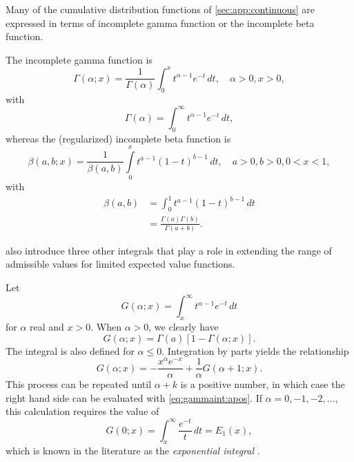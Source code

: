 \documentclass[x11names]{article}
\begin{document}
Many of the cumulative distribution functions of
\autoref{sec:app:continuous} are expressed in terms of incomplete
gamma function or the incomplete beta function.

The incomplete gamma function is
\begin{displaymath}
  \Gamma(\alpha; x) = \frac{1}{\Gamma(\alpha)}
  \int_0^x t^{\alpha - 1} e^{-t}\, dt, \quad \alpha > 0, x > 0,
\end{displaymath}
with
\begin{displaymath}
  \Gamma(\alpha) = \int_0^\infty t^{\alpha - 1} e^{-t}\, dt,
\end{displaymath}
whereas the (regularized) incomplete beta function is
\begin{displaymath}
  \beta(a, b; x) = \frac{1}{\beta(a, b)}
  \int\limits_0^x t^{a - 1} (1 - t)^{b - 1}\, dt, \quad a > 0, b > 0, 0 < x < 1,
\end{displaymath}
with
\begin{align*}
  \beta(a, b)
  &= \int_0^1 t^{a - 1} (1 - t)^{b - 1}\, dt \\
  &= \frac{\Gamma(a) \Gamma(b)}{\Gamma(a + b)}.
\end{align*}

\citet{LossModels4e} also introduce three other integrals that play a
role in extending the range of admissible values for limited expected
value functions.

Let
\begin{equation}
  \label{eq:gammaint}
  G(\alpha; x) = \int_x^\infty t^{\alpha - 1} e^{-t}\, dt
\end{equation}
for $\alpha$ real and $x > 0$. When $\alpha > 0$, we clearly have
\begin{equation*}
  \label{eq:gammaint:apos}
  G(\alpha; x) = \Gamma(a) [1 - \Gamma(\alpha; x)].
\end{equation*}
The integral is also defined for $\alpha \le 0$. Integration by parts
yields the relationship
\begin{equation*}
  G(\alpha; x) = -\frac{x^\alpha e^{-x}}{\alpha}
  + \frac{1}{\alpha} G(\alpha + 1; x).
\end{equation*}
This process can be repeated until $\alpha + k$ is a positive number,
in which case the right hand side can be evaluated with
\eqref{eq:gammaint:apos}. If $\alpha = 0, -1, -2, \dots$, this
calculation requires the value of
\begin{equation*}
  \label{eq:expint}
  G(0; x) = \int_x^\infty \frac{e^{-t}}{t}\, dt = E_1(x),
\end{equation*}
which is known in the literature as the \emph{exponential integral}
\citep{Abramowitz:1972}.
\end{document}
